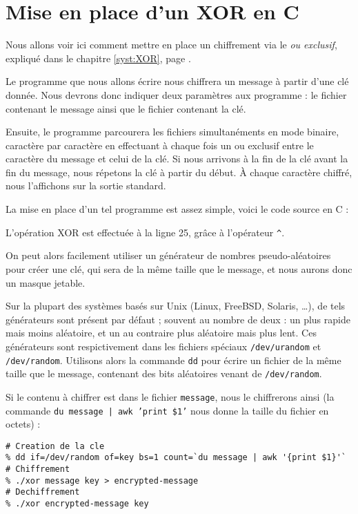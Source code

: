 \chapter{Mise en place d'un XOR en C}
Nous allons voir ici comment mettre en place un chiffrement via le
\emph{ou exclusif}, expliqué dans le chapitre \ref{syst:XOR}, page
\pageref{syst:XOR}.

Le programme que nous allons écrire nous chiffrera un message à partir
d'une clé donnée. Nous devrons donc indiquer deux paramètres aux
programme : le fichier contenant le message ainsi que le fichier
contenant la clé.

Ensuite, le programme parcourera les fichiers simultanéments en mode
binaire, caractère par caractère en effectuant à chaque fois un ou
exclusif entre le caractère du message et celui de la clé. Si nous
arrivons à la fin de la clé avant la fin du message, nous répetons la
clé à partir du début. À chaque caractère chiffré, nous l'affichons
sur la sortie standard.

La mise en place d'un tel programme est assez simple, voici le code
source en C : 
\lstset{language=C}


L'opération XOR est effectuée à la ligne 25, grâce à l'opérateur \texttt{\^}.

On peut alors facilement utiliser un générateur de nombres
pseudo-aléatoires pour créer une clé, qui sera de la même taille que
le message, et nous aurons donc un masque jetable.

Sur la plupart des systèmes basés sur Unix (Linux, FreeBSD, Solaris,
\dots), de tels générateurs sont présent par défaut ; souvent au
nombre de deux : un plus rapide mais moins aléatoire, et un au
contraire plus aléatoire mais plus lent. Ces générateurs sont
respictivement dans les fichiers spéciaux \texttt{/dev/urandom} et
\texttt{/dev/random}. Utilisons alors la commande \texttt{dd} pour
écrire un fichier de la même taille que le message, contenant des bits
aléatoires venant de \texttt{/dev/random}.

Si le contenu à chiffrer est dans le fichier \texttt{message}, nous le
chiffrerons ainsi (la commande \texttt{du message | awk '{print \$1}'}
nous donne la taille du fichier en octets) : 
\lstset{language=csh}
\begin{lstlisting}
# Creation de la cle
% dd if=/dev/random of=key bs=1 count=`du message | awk '{print $1}'`
# Chiffrement
% ./xor message key > encrypted-message
# Dechiffrement
% ./xor encrypted-message key 
\end{lstlisting}

